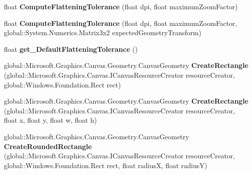 \begin{DoxyCompactItemize}
float {\bfseries Compute\+Flattening\+Tolerance} (float dpi, float maximum\+Zoom\+Factor)
\item 
\mbox{\label{interface_microsoft_1_1_graphics_1_1_canvas_1_1_geometry_1_1_i_canvas_geometry_statics_a769679f8059f4a5c8dc679bb7d677866}} 
float {\bfseries Compute\+Flattening\+Tolerance} (float dpi, float maximum\+Zoom\+Factor, global\+::\+System.\+Numerics.\+Matrix3x2 expected\+Geometry\+Transform)
\item 
\mbox{\label{interface_microsoft_1_1_graphics_1_1_canvas_1_1_geometry_1_1_i_canvas_geometry_statics_a6b02aa62d9240152adb7fda7324bb0aa}} 
float {\bfseries get\+\_\+\+Default\+Flattening\+Tolerance} ()
\item 
\mbox{\label{interface_microsoft_1_1_graphics_1_1_canvas_1_1_geometry_1_1_i_canvas_geometry_statics_aff71f79d64e1ba2376363e2e42b22d9c}} 
global\+::\+Microsoft.\+Graphics.\+Canvas.\+Geometry.\+Canvas\+Geometry {\bfseries Create\+Rectangle} (global\+::\+Microsoft.\+Graphics.\+Canvas.\+I\+Canvas\+Resource\+Creator resource\+Creator, global\+::\+Windows.\+Foundation.\+Rect rect)
\item 
\mbox{\label{interface_microsoft_1_1_graphics_1_1_canvas_1_1_geometry_1_1_i_canvas_geometry_statics_ad213020482dda8837e816bbf8beb83b3}} 
global\+::\+Microsoft.\+Graphics.\+Canvas.\+Geometry.\+Canvas\+Geometry {\bfseries Create\+Rectangle} (global\+::\+Microsoft.\+Graphics.\+Canvas.\+I\+Canvas\+Resource\+Creator resource\+Creator, float x, float y, float w, float h)
\item 
\mbox{\label{interface_microsoft_1_1_graphics_1_1_canvas_1_1_geometry_1_1_i_canvas_geometry_statics_acbf2b94143b555578919975d9e78e754}} 
global\+::\+Microsoft.\+Graphics.\+Canvas.\+Geometry.\+Canvas\+Geometry {\bfseries Create\+Rounded\+Rectangle} (global\+::\+Microsoft.\+Graphics.\+Canvas.\+I\+Canvas\+Resource\+Creator resource\+Creator, global\+::\+Windows.\+Foundation.\+Rect rect, float radiusX, float radiusY)

\end{DoxyCompactItemize}
